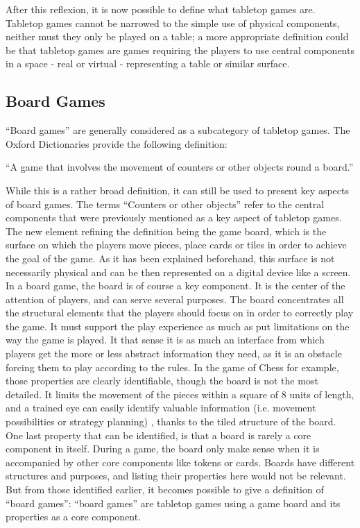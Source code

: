 After this reflexion, it is now possible to define what tabletop games are. Tabletop games cannot be narrowed to the simple use of physical components, neither must they only be played on a table; a more appropriate definition could be that tabletop games are games requiring the players to use central components in a space - real or virtual - representing a table or similar surface.

\subsection{Board Games}

“Board games” are generally considered as a subcategory of tabletop games. The Oxford Dictionaries provide the following definition:

“A game that involves the movement of counters or other objects round a board.”

While this is a rather broad definition, it can still be used to present key aspects of board games. The terms “Counters or other objects” refer to the central components that were previously mentioned as a key aspect of tabletop games. The new element refining the definition being the game board, which is the surface on which the players move pieces, place cards or tiles in order to achieve the goal of the game. As it has been explained beforehand, this surface is not necessarily physical and can be then represented on a digital device like a screen. In a board game, the board is of course a key component. It is the center of the attention of players, and can serve several purposes. 
The board concentrates all the structural elements that the players should focus on in order to correctly play the game. It must support the play experience as much as put limitations on the way the game is played. It that sense it is as much an interface from which players get the more or less abstract information they need, as it is an obstacle forcing them to play according to the rules. In the game of Chess for example, those properties are clearly identifiable, though the board is not the most detailed. It limits the movement of the pieces within a square of 8 units of length, and a trained eye can easily identify valuable information (i.e. movement possibilities or strategy planning) , thanks to the tiled structure of the board. One last property that can be identified, is that a board is rarely a core component in itself. During a game, the board only make sense when it is accompanied by other core components like tokens or cards. Boards have different structures and purposes, and listing their properties here would not be relevant. But from those identified earlier, it becomes possible to give a definition of “board games”: “board games” are tabletop games using a game board and its properties as a core component.


